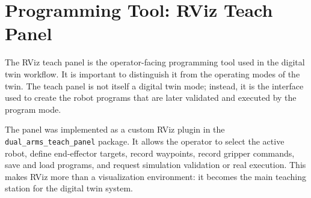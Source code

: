 \section{Programming Tool: RViz Teach Panel}

The RViz teach panel is the operator-facing programming tool used in the digital twin workflow. It is important to distinguish it from the operating modes of the twin. The teach panel is not itself a digital twin mode; instead, it is the interface used to create the robot programs that are later validated and executed by the program mode.

The panel was implemented as a custom RViz plugin in the \texttt{dual\_arms\_teach\_panel} package. It allows the operator to select the active robot, define end-effector targets, record waypoints, record gripper commands, save and load programs, and request simulation validation or real execution. This makes RViz more than a visualization environment: it becomes the main teaching station for the digital twin system.

